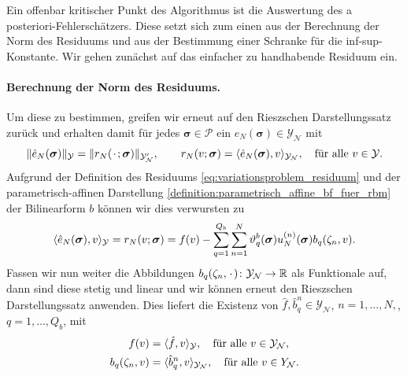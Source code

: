 \documentclass[../main.tex]{subfiles}
\begin{document}
Ein offenbar kritischer Punkt des Algorithmus ist die Auswertung des a posteriori-Fehlerschätzers.
Diese setzt sich zum einen aus der Berechnung der Norm des Residuums und aus der Bestimmung einer Schranke für die inf-sup-Konstante.
Wir gehen zunächst auf das einfacher zu handhabende Residuum ein.

\paragraph{Berechnung der Norm des Residuums.} %
\label{par:berechnung_der_norm_des_residuum}

Um diese zu bestimmen, greifen wir erneut auf den Rieszschen Darstellungssatz zurück und erhalten damit für jedes $\bm \sigma \in \mathcal P$ ein $\hat{e}_{N}(\bm \sigma) \in \mathcal Y_{\mathcal N}$ mit
\begin{equation}
    \norm{\hat{e}_{N}(\bm \sigma)}_{\mathcal Y} = \norm{r_{N}(\blank; \bm \sigma)}_{\mathcal Y_{\mathcal N}'}, \qquad
    r_{N}(v; \bm \sigma) = \skp{\hat{e}_{N}(\bm \sigma)}{v}{\mathcal Y_{\mathcal N}}, \quad \fa v \in \mathcal Y.
\end{equation}
Aufgrund der Definition des Residuums \cref{eq:variationsproblem_residuum} und der parametrisch-affinen Darstellung \cref{definition:parametrisch_affine_bf_fuer_rbm} der Bilinearform $b$ können wir dies verwursten zu
\begin{equation}
    \skp{\hat{e}_{N}(\bm \sigma)}{v}{\mathcal Y}
    = r_{N}(v; \bm \sigma)
    = f(v) - \sum_{q = 1}^{Q_b} \sum_{n = 1}^{N} \theta_{q}^{b}(\bm \sigma) u^{(n)}_{N}(\bm \sigma) b_{q}(\zeta_{n}, v).
\end{equation}
Fassen wir nun weiter die Abbildungen $b_{q}(\zeta_{n}, \blank) \colon \mathcal Y_{\mathcal N} \to \mathbb{R}$ als Funktionale auf, dann sind diese stetig und linear und wir können erneut den Rieszschen Darstellungssatz anwenden.
Dies liefert die Existenz von $\hat{f}, \hat{b}^{n}_{q} \in \mathcal Y_{\mathcal N}$, $n = 1, \dots, N,$, $q = 1, \dots, Q_b$, mit
\begin{equation}
    \begin{aligned}
        f(v) &= \skp{\hat{f}}{v}{\mathcal Y}, \quad \fa v \in \mathcal Y_{\mathcal N},
        \\
        b_{q}(\zeta_{n}, v) &= \skp{\hat{b}^{n}_{q}}{v}{\mathcal Y_{\mathcal N}}, \quad \fa v \in \mathcal \mathcal Y_{\mathcal N}.
    \end{aligned}
\end{equation}
\end{document}
